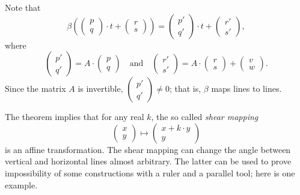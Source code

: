 Note that 
\[\beta\left((\begin{smallmatrix}p\\q
\end{smallmatrix} )\cdot t
+
(\begin{smallmatrix}r\\s
\end{smallmatrix} )\right)
=
(\begin{smallmatrix}p'\\q'
\end{smallmatrix})\cdot t
+
(\begin{smallmatrix}r'\\s'
\end{smallmatrix} ),\]
where 
\[(\begin{smallmatrix}p'\\q'
\end{smallmatrix})=A\cdot(\begin{smallmatrix}p\\q
\end{smallmatrix})
\quad\text{and}\quad
(\begin{smallmatrix}r'\\s'
\end{smallmatrix})=A\cdot(\begin{smallmatrix}r\\s
\end{smallmatrix})+
\left(\begin{smallmatrix}
v\\ w
\end{smallmatrix} \right).
\]
Since the matrix $A$ is invertible, $(\begin{smallmatrix}p'\\q'
\end{smallmatrix})\ne 0$; 
that is, $\beta$ maps lines to lines.
\qeds

The theorem implies that for any real $k$, 
the so called {}\emph{shear mapping}
\[\left(\begin{smallmatrix}
x\\ y
\end{smallmatrix} \right)\mapsto \left(\begin{smallmatrix}
x+k\cdot y\\ y
\end{smallmatrix} \right)\] is an affine transformation.
The shear mapping can change the angle between vertical and horizontal lines almost arbitrary.
The latter can be used to prove impossibility of some constructions with a ruler and a parallel tool;
here is one example.


